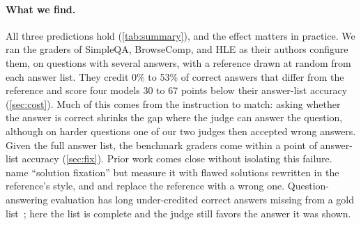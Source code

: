 \documentclass{article}
\begin{document}
\paragraph{What we find.}
All three predictions hold (\cref{tab:summary}), and the effect matters in practice.
We ran the graders of SimpleQA, BrowseComp, and HLE as their authors configure them, on questions with several answers, with a reference drawn at random from each answer list.
They credit 0\% to 53\% of correct answers that differ from the reference and score four models 30 to 67 points below their answer-list accuracy (\cref{sec:cost}).
Much of this comes from the instruction to match: asking whether the answer is correct shrinks the gap where the judge can answer the question, although on harder questions one of our two judges then accepted wrong answers.
Given the full answer list, the benchmark graders come within a point of answer-list accuracy (\cref{sec:fix}).
Prior work comes close without isolating this failure.
\citet{fixation2025} name ``solution fixation'' but measure it with flawed solutions rewritten in the reference's style, and \citet{judgingref2026} and \citet{krumdick2025nofreelabels} replace the reference with a wrong one.
Question-answering evaluation has long under-credited correct answers missing from a gold list~\citep{min2020ambigqa,kamalloo2023evaluating}; here the list is complete and the judge still favors the answer it was shown.
\end{document}
